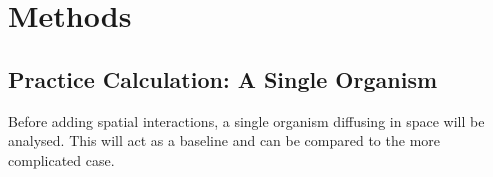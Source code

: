 \documentclass{article}
\begin{document}

\section{Methods}
\subsection{Practice Calculation: A Single Organism}
Before adding spatial interactions, a single organism diffusing in space will be analysed.
This will act as a baseline and can be compared to the more complicated case.
\end{document}
